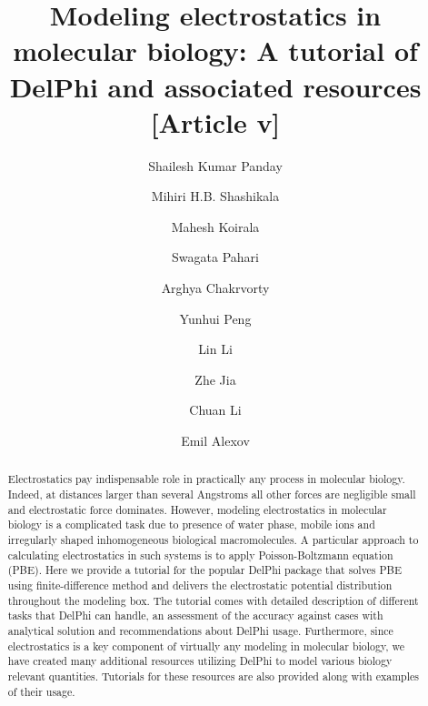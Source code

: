 \documentclass[9pt,tutorial]{livecoms}
\title{Modeling electrostatics in molecular biology: A tutorial of DelPhi and associated resources [Article v\versionnumber]}
\author[1]{Shailesh Kumar Panday}
\author[1]{Mihiri H.B. Shashikala}
\author[1]{Mahesh Koirala}
\author[1]{Swagata Pahari}
\author[1]{Arghya Chakrvorty}
\author[2]{Yunhui Peng}
\author[3]{Lin Li}
\author[4]{Zhe Jia}
\author[5]{Chuan Li}
\author[1*]{Emil Alexov}
\affil[1]{Department of Physics, Clemson University, Clemson, SC 29634, USA}
\affil[2]{Institution 2}
\affil[3]{Institution 3}
\affil[4]{Institution 4}
\affil[5]{Institution 5}
\begin{document}
\begin{frontmatter}
\maketitle

\begin{abstract}

Electrostatics pay indispensable role in practically any process in molecular biology. Indeed, at distances larger than several Angstroms all other forces are negligible small and electrostatic force dominates. However, modeling electrostatics in molecular biology is a complicated task due to presence of water phase, mobile ions and irregularly shaped inhomogeneous biological macromolecules. A particular approach to calculating electrostatics in such systems is to apply Poisson-Boltzmann equation (PBE). Here we provide a tutorial for the popular DelPhi package that solves PBE using finite-difference method and delivers the electrostatic potential distribution throughout the modeling box. The tutorial comes with detailed description of different tasks that DelPhi can handle, an assessment of the accuracy against cases with analytical solution and recommendations about DelPhi usage. Furthermore, since electrostatics is a key component of virtually any modeling in molecular biology, we have created many additional resources utilizing DelPhi to model various biology relevant quantities. Tutorials for these resources are also provided along with examples of their usage. 
\end{abstract}

\end{frontmatter}
\end{document}
